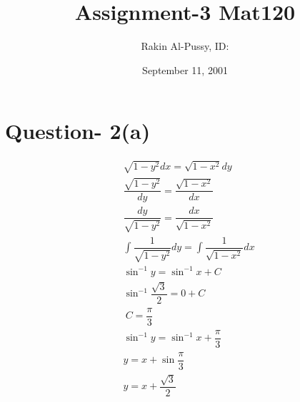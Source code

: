 \documentclass[12pt]{article}
\title{Assignment-3 Mat120}
\author{Rakin Al-Pussy,\: ID:\:42069 }
\date{September 11, 2001}
\begin{document}
\maketitle

\section{Question- 2(a)}
\begin{align*}
   & \sqrt{1-y^2} dx = \sqrt{1 - x^2} dy \\
   & \dfrac{\sqrt{1-y^2}}{dy} = \dfrac{\sqrt{1 - x^2}}{dx} \\
   & \dfrac{dy}{\sqrt{1-y^2}} = \dfrac{dx}{\sqrt{1-x^2}} \\
   &\int \dfrac{1}{\sqrt{1-y^{2}}} dy = \int \dfrac{1}{\sqrt{1-x^{2}}} dx \\
   &\sin^{-1} y = \sin^{-1} x  + C \\
   &\sin^{-1} {\dfrac{\sqrt{3}}{2}} = 0 + C \\
   & \ C = \dfrac{\pi}{3} \\
   &\sin^{-1} y = \sin^{-1} x+  \dfrac{\pi}{3} \\
   &y = x + \sin{\dfrac{\pi}{3}} \\
   &y = x + \dfrac{\sqrt{3}}{2} \\
\end{align*}
\end{document}
